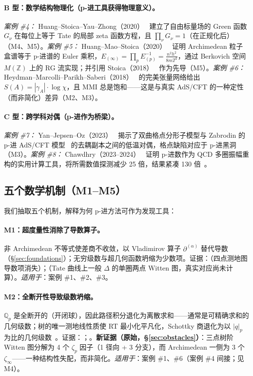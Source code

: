 \documentclass[11pt,a4paper]{ctexart}
\theoremstyle{remark}
\newcommand{\Qp}{\mathbb{Q}_p}
\newcommand{\dpartial}{\partial^{(\alpha)}}
\newcommand{\normp}[1]{|#1|_p}
\begin{document}
\paragraph{B 型：数学结构物理化（p-进工具获得物理意义）。}
\textit{案例 \#4：} Huang--Stoica--Yau--Zhong（2020）~\cite{HSYZ20} 建立了自由标量场的 Green 函数 $G_\nu$ 在每位上等于 Tate 的局部 zeta 函数方程，且 $\prod_\nu G_\nu = 1$（在正规化后）（M4、M5）。\textit{案例 \#5：} Huang--Mao--Stoica（2020）~\cite{HMS20} 证明 Archimedean 粒子盒谱等于 p-进谱的 Euler 乘积，$E_{(\infty)} = \prod_p E_{(p)}^{-1} = \frac{n^2 h^2}{8 m T^2}$，通过 Berkovich 空间 $M(\mathbb{Z})$ 上的 RG 流实现；并引用 Stoica（2018）~\cite{S18} 作为先导（M5）。\textit{案例 \#6：} Heydman--Marcolli--Parikh--Saberi（2018）~\cite{HMPS18} 的完美张量网络给出 $S(A) = |\gamma_A| \cdot \log \chi$，且 MMI 总是饱和——这是与真实 AdS/CFT 的一种定性（而非简化）差异（M2、M3）。

\paragraph{C 型：跨学科对偶（p-进作为桥梁）。}
\textit{案例 \#7：} Yan--Jepsen--Oz（2023）~\cite{YJO23} 揭示了双曲格点分形子模型与 Zabrodin 的 p-进 AdS/CFT 模型~\cite{CMZ89} 的去耦副本之间的低温对偶，格点缺陷对应于 p-进黑洞（M3）。\textit{案例 \#8：} Chawdhry（2023--2024）~\cite{C23,C24} 证明 p-进数作为 QCD 多圈振幅重构的实用计算工具，将所需数值探测减少 25 倍，结果紧凑 130 倍~\cite{C23}。

\subsection{五个数学机制（M1--M5）}
\label{sec:mechanisms}

我们抽取五个机制，解释为何 p-进方法可作为发现工具：

\paragraph{M1：超度量性消除了导数算子。}
非 Archimedean 不等式使差商不收敛，以 Vladimirov 算子 $\dpartial$ 替代导数（\S\ref{sec:foundations}）；无穷级数与超几何函数坍缩为少数项。证据：\cite{GP17}（四点测地图导数项消失）；\cite{HJ24}（Tate 曲线上一般 $\Delta$ 的单圈两点 Witten 图，真实对应尚未计算）。\emph{适用于}：案例 \#1、\#2、\#3。

\paragraph{M2：全断开性导致级数坍缩。}
$\Qp$ 是全断开的（开闭球），因此路径积分退化为离散求和——通常是可精确求和的几何级数；树的唯一测地线性质使 RT 最小化平凡化，Schottky 商退化为以 $\normp{q}$ 为比的几何级数~\cite{CMZ89}。证据：\cite{HMPS18}；\cite{CMZ89}。\textbf{新证据（原始，\S\ref{sec:obstacles}）}：三点树阶 Witten 图分解为 4 个 $\zeta_p$ 因子（1 径向 + 3 分支），而 Archimedean 一侧为 3 个 $\zeta_\infty$——一种结构性失配，而非简化。\emph{适用于}：案例 \#1、\#6（案例 \#4 间接；见 M4）。
\end{document}
